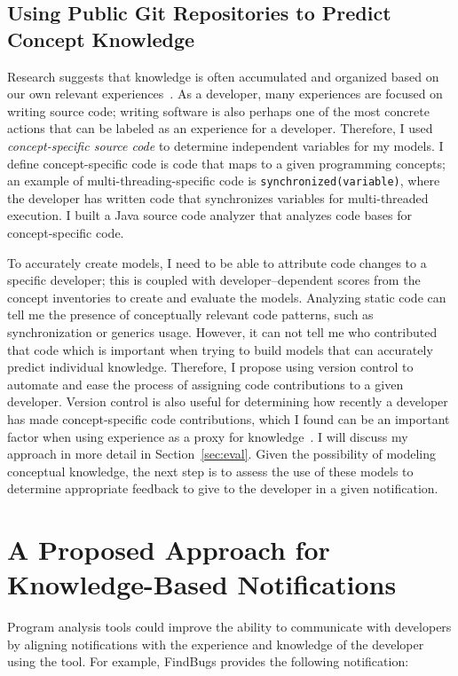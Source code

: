 \documentclass{llncs}
\begin{document}
\subsection{Using Public Git Repositories to Predict Concept Knowledge}
Research suggests that knowledge is often accumulated and organized based on our own relevant experiences~\cite{johnson1989mental,argote2011organizational}. As a developer, many experiences are focused on writing source code; writing software is also perhaps one of the most concrete actions that can be labeled as an experience for a developer. Therefore, I used \emph{concept-specific source code} to determine independent variables for my models. I define concept-specific code is code that maps to a given programming concepts; an example of multi-threading-specific code is \texttt{synchronized(variable)}, where the developer has written code that synchronizes variables for multi-threaded execution.
I built a Java source code analyzer that analyzes code bases for concept-specific code.

To accurately create models, I need to be able to attribute code changes to a specific developer; this is coupled with developer--dependent scores from the concept inventories to create and evaluate the models. Analyzing static code can tell me the presence of conceptually relevant code patterns, such as synchronization or generics usage. However, it can not tell me who contributed that code which is important when trying to build models that can accurately predict individual knowledge. 
Therefore, I propose using version control to automate and ease the process of assigning code contributions to a given developer. 
Version control is also useful for determining how recently a developer has made concept-specific code contributions, which I found can be an important factor when using experience as a proxy for knowledge~\cite{johnson2015bespoke}. %
I will discuss my approach in more detail in Section~\ref{sec:eval}.
Given the possibility of modeling conceptual knowledge, the next step is to assess the use of these models to determine appropriate feedback to give to the developer in a given notification.


\section{A Proposed Approach for Knowledge-Based Notifications}
Program analysis tools could improve the ability to communicate with developers by aligning notifications with the experience and knowledge of the developer using the tool.
For example, FindBugs provides the following notification:
\end{document}
